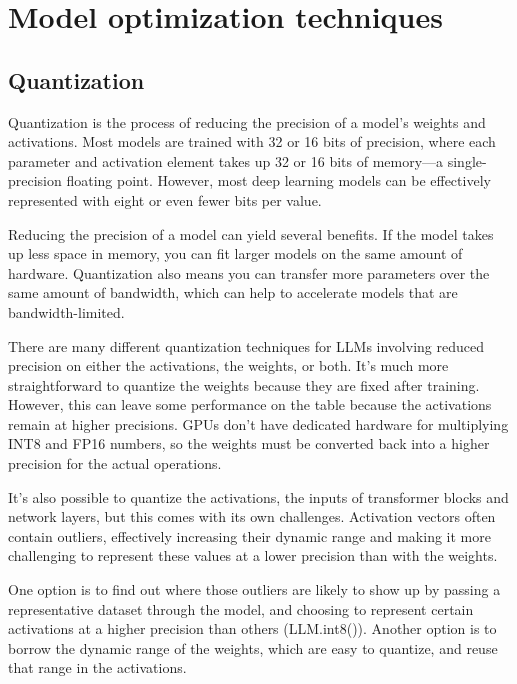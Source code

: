 
\section{Model optimization techniques}

\subsection{Quantization}

Quantization is the process of reducing the precision of a model's weights and activations. Most models are trained with 32 or 16 bits of precision, where each parameter and activation element takes up 32 or 16 bits of memory—a single-precision floating point. However, most deep learning models can be effectively represented with eight or even fewer bits per value.  

Reducing the precision of a model can yield several benefits. If the model takes up less space in memory, you can fit larger models on the same amount of hardware. Quantization also means you can transfer more parameters over the same amount of bandwidth, which can help to accelerate models that are bandwidth-limited. 

There are many different quantization techniques for LLMs involving reduced precision on either the activations, the weights, or both. It's much more straightforward to quantize the weights because they are fixed after training. However, this can leave some performance on the table because the activations remain at higher precisions. GPUs don't have dedicated hardware for multiplying INT8 and FP16 numbers, so the weights must be converted back into a higher precision for the actual operations. 

It's also possible to quantize the activations, the inputs of transformer blocks and network layers, but this comes with its own challenges. Activation vectors often contain outliers, effectively increasing their dynamic range and making it more challenging to represent these values at a lower precision than with the weights. 

One option is to find out where those outliers are likely to show up by passing a representative dataset through the model, and choosing to represent certain activations at a higher precision than others (LLM.int8()). Another option is to borrow the dynamic range of the weights, which are easy to quantize, and reuse that range in the activations.

